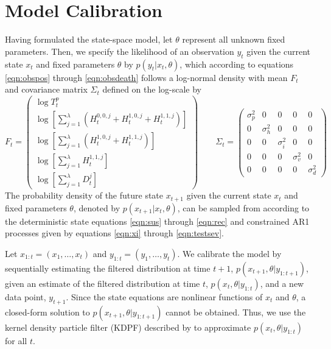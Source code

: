 \documentclass{article}
\begin{document}
\section{Model Calibration \label{sec:est}}
Having formulated the state-space model, let $\theta$ represent all unknown fixed parameters. Then, we specify the likelihood of an observation $y_t$ given the current state $x_t$ and fixed parameters $\theta$ by $p(y_t|x_t,\theta)$, which according to equations \ref{eqn:obspos} through \ref{eqn:obsdeath} follows a log-normal density with mean $F_t$ and covariance matrix $\Sigma_t$ defined on the log-scale by
\[
F_t = \left(
\begin{array}{c}
\log T^p_t \\
\log \left[ \sum_{j=1}^{\lambda} \left(H^{0,0,j}_t + H^{1,0,j}_t + H^{1,1,j}_t\right) \right] \\
\log \left[ \sum_{j=1}^{\lambda} \left(H^{1,0,j}_t + H^{1,1,j}_t\right) \right] \\
\log \left[ \sum_{j=1}^{\lambda}H^{1,1,j}_t \right] \\
\log \left[ \sum_{j=1}^\lambda D^j_t \right]
\end{array}
\right)
\qquad
\Sigma_t = \left(
\begin{array}{ccccc}
\sigma^2_p & 0 & 0 & 0 & 0 \\
0 & \sigma^2_h & 0 & 0 & 0 \\
0 & 0 & \sigma^2_i & 0 & 0 \\
0 & 0 & 0 & \sigma^2_v & 0 \\
0 & 0 & 0 & 0 & \sigma^2_d
\end{array}
\right)
\]
The probability density of the future state $x_{t+1}$ given the current state $x_t$ and fixed parameters $\theta$, denoted by $p(x_{t+1}|x_t,\theta)$, can be sampled from according to the deterministic state equations \ref{eqn:sus} through \ref{eqn:rec} and constrained AR1 processes given by equations \ref{eqn:xi} through \ref{eqn:testsev}.

Let $x_{1:t} = (x_1,\ldots,x_t)$ and $y_{1:t} = (y_1,\ldots,y_t)$. We calibrate the model by sequentially estimating the filtered distribution at time $t+1$, $p(x_{t+1},\theta|y_{1:{t+1}})$, given an estimate of the filtered distribution at time $t$, $p(x_t,\theta|y_{1:t})$, and a new data point, $y_{t+1}$. Since the state equations are nonlinear functions of $x_t$ and $\theta$, a closed-form solution to $p(x_{t+1},\theta|y_{1:{t+1}})$ cannot be obtained. Thus, we use the kernel density particle filter (KDPF) described by \citet{Liu:West:comb:2001} to approximate $p(x_t,\theta|y_{1:t})$ for all $t$.
\end{document}
